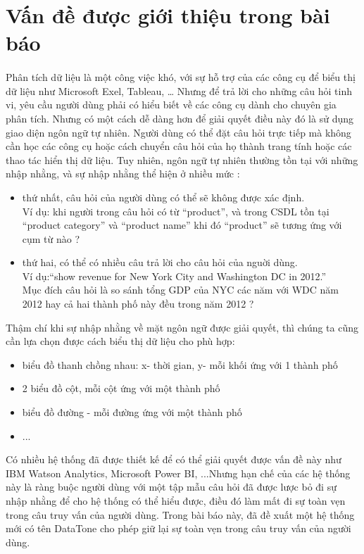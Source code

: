 \documentclass[12pt]{report}
\begin{document}
\newpage
\setcounter{page}{1}

\section{Vấn đề được giới thiệu trong bài báo}
\paragraph*{}
Phân tích dữ liệu là một công việc khó, với sự hỗ trợ của các công cụ để biểu thị dữ liệu như Microsoft Exel, Tableau, … Nhưng để trả lời cho những câu hỏi tinh vi, yêu cầu người dùng phải có hiểu biết về các công cụ dành cho chuyên gia phân tích. Nhưng có một cách dễ dàng hơn để giải quyết điều này đó là sử dụng giao diện ngôn ngữ tự nhiên. Người dùng có thể đặt câu hỏi trực tiếp mà không cần học các công cụ hoặc cách chuyển câu hỏi của họ thành trang tính hoặc các thao tác hiển thị dữ liệu. Tuy nhiên, ngôn ngữ tự nhiên thường tồn tại với những nhập nhằng, và sự nhập nhằng thể hiện ở nhiều mức :
\begin{itemize}
	\item thứ nhất, câu hỏi của người dùng có thể sẽ không được 	xác định. \\
	Ví dụ: khi người trong câu hỏi có từ  “product”, và trong CSDL tồn tại “product category” và “product name” khi đó “product” sẽ tương ứng với cụm từ nào ?
	
	\item thứ hai, có thể có nhiều câu trả lời cho câu hỏi của nguời dùng. \\
	Ví dụ:“show revenue for New York City and Washington DC in 2012.” \\
	Mục đích câu hỏi là so sánh tổng GDP của NYC các năm với WDC năm 2012 hay cả hai thành phố này đều trong năm 2012 ?
\end{itemize}
Thậm chí khi sự nhập nhằng về mặt ngôn ngữ được giải quyết, thì chúng ta cũng cần lựa chọn được cách biểu thị dữ liệu cho phù hợp:
\begin{itemize}
	\item biểu đồ thanh chồng nhau: x- thời gian, y- mỗi khối ứng với 1 thành phố
	\item 2 biểu đồ cột, mỗi cột ứng với một thành phố
	\item biểu đồ đường - mỗi đường ứng với một thành phố
	\item ...
\end{itemize}
Có nhiều hệ thống đã được thiết kế để có thể giải quyết được vấn đề này như IBM Watson Analytics, Microsoft Power BI, ...Nhưng hạn chế của các hệ thống này là ràng buộc người dùng với một tập mẫu câu hỏi đã được lược bỏ đi sự nhập nhằng để cho hệ thống có thể hiểu được, điều đó làm mất đi sự toàn vẹn trong câu truy vấn của người dùng. Trong bài báo này, đã đề xuất một hệ thống mới có tên DataTone cho phép giữ lại sự toàn vẹn trong câu truy vấn của người dùng. 
\end{document}
